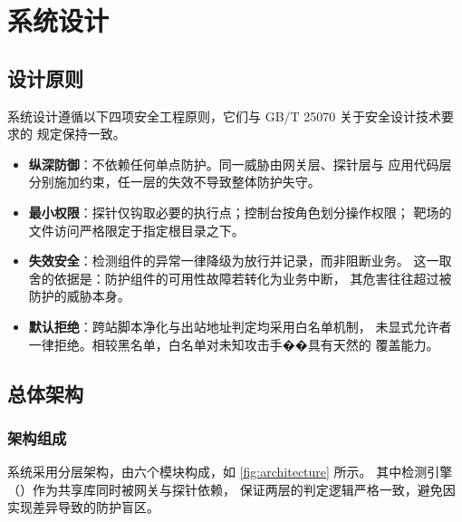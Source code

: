 \section{系统设计}
\label{sec:design}

\subsection{设计原则}

系统设计遵循以下四项安全工程原则，它们与 GB/T 25070 关于安全设计技术要求的
规定保持一致\cite{gbt25070}。

\begin{itemize}
  \item \textbf{纵深防御}：不依赖任何单点防护。同一威胁由网关层、探针层与
        应用代码层分别施加约束，任一层的失效不导致整体防护失守。
  \item \textbf{最小权限}：探针仅钩取必要的执行点；控制台按角色划分操作权限；
        靶场的文件访问严格限定于指定根目录之下。
  \item \textbf{失效安全}：检测组件的异常一律降级为放行并记录，而非阻断业务。
        这一取舍的依据是：防护组件的可用性故障若转化为业务中断，
        其危害往往超过被防护的威胁本身。
  \item \textbf{默认拒绝}：跨站脚本净化与出站地址判定均采用白名单机制，
        未显式允许者一律拒绝。相较黑名单，白名单对未知攻击手��具有天然的
        覆盖能力。
\end{itemize}

\subsection{总体架构}

\subsubsection{架构组成}

系统采用分层架构，由六个模块构成，如 \cref{fig:architecture} 所示。
其中检测引擎（）作为共享库同时被网关与探针依赖，
保证两层的判定逻辑严格一致，避免因实现差异导致的防护盲区。

